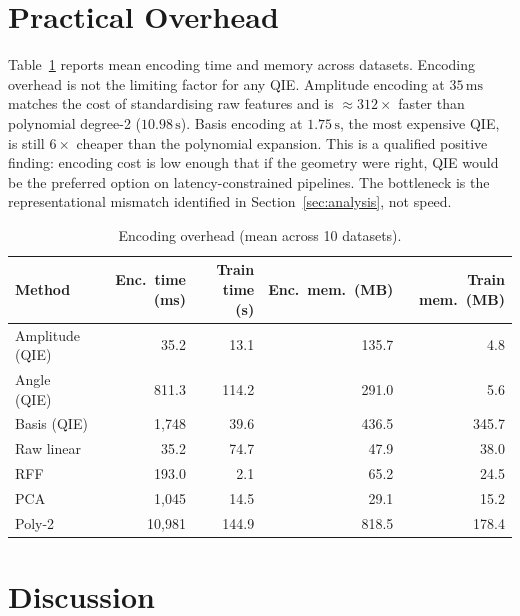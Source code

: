 \documentclass[12pt]{article}
\begin{document}
\section{Practical Overhead}
\label{sec:overhead}

Table~\ref{tab:overhead} reports mean encoding time and memory across datasets.
Encoding overhead is not the limiting factor for any QIE.
Amplitude encoding at $35\,\mathrm{ms}$ matches the cost of standardising raw
features and is ${\approx}312\times$ faster than polynomial degree-2
($10.98\,\mathrm{s}$).
Basis encoding at $1.75\,\mathrm{s}$, the most expensive QIE, is still
$6\times$ cheaper than the polynomial expansion.
This is a qualified positive finding: encoding cost is low enough that if the
geometry were right, QIE would be the preferred option on latency-constrained
pipelines.
The bottleneck is the representational mismatch identified in
Section~\ref{sec:analysis}, not speed.

\begin{table}[tbp]
\centering
\caption{Encoding overhead (mean across 10 datasets).}
\label{tab:overhead}
\small
\begin{tabular}{lrrrr}
\toprule
Method & Enc.\ time (ms) & Train time (s) & Enc.\ mem.\ (MB) & Train mem.\ (MB) \\
\midrule
Amplitude (QIE) &     35.2 &    13.1 & 135.7 &   4.8 \\
Angle (QIE)     &    811.3 &   114.2 & 291.0 &   5.6 \\
Basis (QIE)     &  1{,}748 &    39.6 & 436.5 & 345.7 \\
\midrule
Raw linear      &     35.2 &    74.7 &  47.9 &  38.0 \\
RFF             &    193.0 &     2.1 &  65.2 &  24.5 \\
PCA             &  1{,}045 &    14.5 &  29.1 &  15.2 \\
Poly-2          & 10{,}981 &   144.9 & 818.5 & 178.4 \\
\bottomrule
\end{tabular}
\end{table}

\section{Discussion}
\label{sec:discussion}
\end{document}
